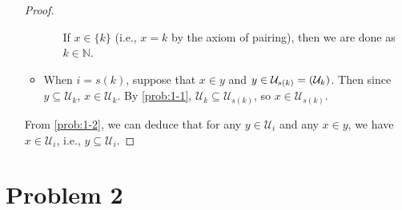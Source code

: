 \documentclass[a4paper]{article}
\newcommand{\N}{\mathbb{N}}
\let\P\relax
\newcommand{\P}{\mathcal{P}}
\newcommand{\U}{\mathcal{U}}
\begin{document}
\begin{enumerate}
\begin{proof}
\begin{itemize}
\begin{itemize}
        If $x \in \{k\}$ (i.e., $x = k$ by the axiom of pairing), then we are done as $k \in \N$.
      \end{itemize}
    \item When $i = s(k)$, suppose that $x \in y$ and $y \in \U_{s(k)} = \P(\U_{k})$.
      Then since $y \subseteq \U_{k}$, $x \in \U_{k}$.
      By \ref{prob:1-1}, $\U_{k} \subseteq \U_{s(k)}$, so $x \in \U_{s(k)}$.
    \end{itemize}
    From \ref{prob:1-2}, we can deduce that for any $y \in \U_{i}$ and any $x \in y$, we have $x \in \U_{i}$, i.e., $y \subseteq \U_{i}$.
  \end{proof}
\end{enumerate}

\section*{Problem 2}
\end{document}
